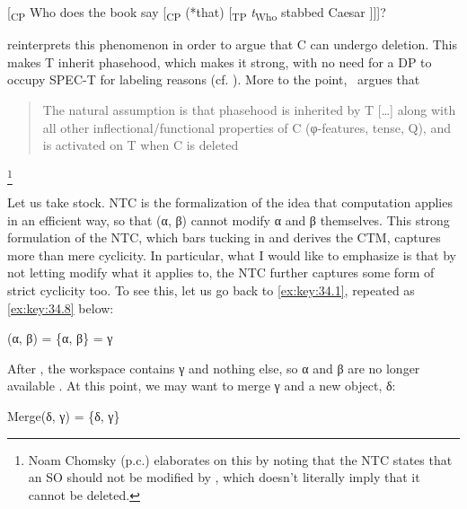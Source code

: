 \documentclass[output=paper]{langsci/langscibook}
\begin{document}
\ea%
    \label{ex:key:34.7}
    [\textsubscript{CP} Who does the book say [\textsubscript{CP} (*that)
        [\textsubscript{TP} \emph{t}\textsubscript{Who} stabbed Caesar ]]]?
\z

\citet{Chomsky2015} reinterprets this phenomenon in order to argue that C can
undergo deletion. This makes T inherit phasehood, which makes it strong, with
no need for a DP to occupy SPEC-T for labeling reasons (cf.
\citealt{Gallego2017}). More to the point,~\textcite[11]{Chomsky2015} argues
that \blockquote{The natural assumption is that phasehood is inherited by T
    [\dots{}] along with all other inflectional/functional properties of C
    (φ-features, tense, Q), and is activated on T when C is
deleted}.\footnote{Noam Chomsky (p.c.) elaborates on this by noting that the
\gls{NTC} states that an \gls{SO} should not be modified by , which
doesn’t literally imply that it cannot be deleted.}

\largerpage
Let us take stock. \gls{NTC} is the formalization of the idea that computation
applies in an efficient way, so that  (α, β) cannot modify α and β
themselves. This strong formulation of the \gls{NTC}, which bars tucking in and
derives the \gls{CTM}, captures more than mere cyclicity. In particular, what I
would like to emphasize is that by not letting  modify what it applies to,
the \gls{NTC} further captures some form of strict cyclicity too. To see this,
let us go back to \eqref{ex:key:34.1}, repeated as \eqref{ex:key:34.8} below:

\ea%
    \label{ex:key:34.8}
           (α, β) = \{α, β\} = γ
\z

After , the workspace contains γ and nothing else, so α and β are
no longer available \citep[243]{Chomsky1995}. At this point, we may want to
merge γ and a new object, δ:

\ea%
    \label{ex:key:34.9}
          Merge(δ, γ) = \{δ, γ\}
\z
\end{document}
